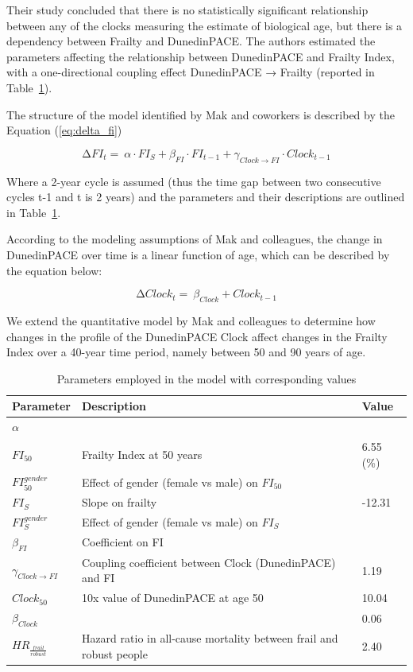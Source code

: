 Their study concluded that there is no statistically significant relationship between any of the clocks measuring the estimate of biological age, but there is a dependency between Frailty and DunedinPACE. The authors estimated the parameters affecting the relationship between DunedinPACE and Frailty Index, with a one-directional coupling effect DunedinPACE → Frailty (reported in Table~\ref{tab:parameters}).

The structure of the model identified by Mak and coworkers is described by the Equation (\ref{eq:delta_fi})

\begin{equation}\label{eq:delta_fi}
{\mathrm{\Delta}FI}_{t} = \ \alpha \cdot {FI}_{S} + \beta_{FI} \cdot {FI}_{t - 1} + \gamma_{Clock \rightarrow FI} \cdot {Clock}_{t - 1}
\end{equation}

Where a 2-year cycle is assumed (thus the time gap between two consecutive cycles t-1 and t is 2 years) and the parameters and their descriptions are outlined in Table~\ref{tab:parameters}.

According to the modeling assumptions of Mak and colleagues, the change in DunedinPACE over time is a linear function of age, which can be described by the equation below:

\begin{equation}\label{eq:delta_clock}
{\mathrm{\Delta}Clock}_{t} = \ \beta_{Clock} + {Clock}_{t - 1}
\end{equation}

We extend the quantitative model by Mak and colleagues to determine how changes in the profile of the DunedinPACE Clock affect changes in the Frailty Index over a 40-year time period, namely between 50 and 90 years of age.
\begin{table}[h]
\centering
\small
\setlength{\tabcolsep}{4pt}
\begin{tabular}{lp{5.5cm}l}
\toprule
\textbf{Parameter} & \textbf{Description} & \textbf{Value} \\
\midrule
$\alpha$ & & \\
$FI_{50}$ & Frailty Index at 50 years & 6.55 (\%) \\
$FI_{50}^{gender}$ & Effect of gender (female vs male) on $FI_{50}$ & \\
$FI_{S}$ & Slope on frailty & -12.31 \\
$FI_{S}^{gender}$ & Effect of gender (female vs male) on $FI_{S}$ & \\
$\beta_{FI}$ & Coefficient on FI & \\
$\gamma_{Clock \rightarrow FI}$ & Coupling coefficient between Clock (DunedinPACE) and FI & 1.19 \\
$Clock_{50}$ & 10x value of DunedinPACE at age 50 & 10.04 \\
$\beta_{Clock}$ & & 0.06 \\
$HR_{\frac{frail}{robust}}$ & Hazard ratio in all-cause mortality between frail and robust people & 2.40 \\
\bottomrule
\end{tabular}
\caption{Parameters employed in the model with corresponding values}
\label{tab:parameters}
\end{table}

